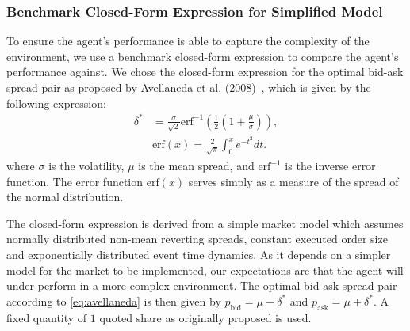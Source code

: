 \subsubsection{Benchmark Closed-Form Expression for Simplified Model}
To ensure the agent's performance is able to capture the complexity of the environment, we use a benchmark closed-form expression
to compare the agent's performance against.
We chose the closed-form expression for the optimal bid-ask spread pair as proposed by Avellaneda et al. (2008)~\cite{Avellaneda2008},
which is given by the following expression:
\begin{equation}
    \begin{aligned}
        \delta^* &= \frac{\sigma}{\sqrt{2}} \text{erf}^{-1} \left( \frac{1}{2} \left( 1 + \frac{\mu}{\sigma} \right) \right),\\
        &\text{erf}(x) = \frac{2}{\sqrt{\pi}} \int_{0}^{x} e^{-t^2} dt.
    \end{aligned}
    \label{eq:avellaneda}
\end{equation}
where $\sigma$ is the volatility, $\mu$ is the mean spread, and $\text{erf}^{-1}$ is the inverse error function.
The error function $\text{erf}(x)$ serves simply as a measure of the spread of the normal distribution.

The closed-form expression is derived from a simple market model which assumes normally distributed non-mean reverting spreads,
constant executed order size and exponentially distributed event time dynamics.
As it depends on a simpler model for the market to be implemented, our expectations are that the agent will under-perform in a more complex environment.
The optimal bid-ask spread pair according to \autoref{eq:avellaneda} is then given by $p_\text{bid} = \mu - \delta^*$ and $p_\text{ask} = \mu + \delta^*$.
A fixed quantity of $1$ quoted share as originally proposed is used.
